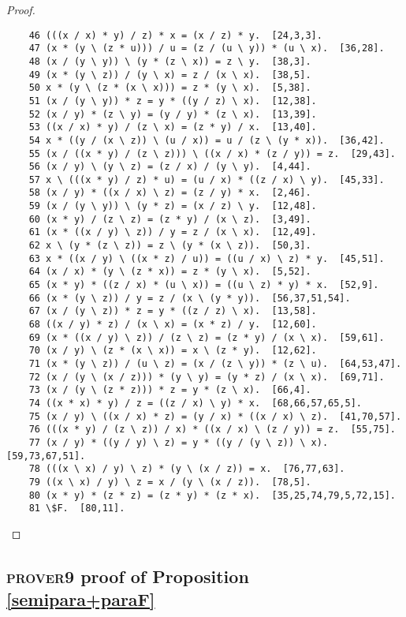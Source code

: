 \documentclass[12pt]{report}
\theoremstyle{definition}
\begin{document}
\begin{proof}
\begin{lstlisting}
    46 (((x / x) * y) / z) * x = (x / z) * y.  [24,3,3].
    47 (x * (y \ (z * u))) / u = (z / (u \ y)) * (u \ x).  [36,28].
    48 (x / (y \ y)) \ (y * (z \ x)) = z \ y.  [38,3].
    49 (x * (y \ z)) / (y \ x) = z / (x \ x).  [38,5].
    50 x * (y \ (z * (x \ x))) = z * (y \ x).  [5,38].
    51 (x / (y \ y)) * z = y * ((y / z) \ x).  [12,38].
    52 (x / y) * (z \ y) = (y / y) * (z \ x).  [13,39].
    53 ((x / x) * y) / (z \ x) = (z * y) / x.  [13,40].
    54 x * ((y / (x \ z)) \ (u / x)) = u / (z \ (y * x)).  [36,42].
    55 (x / ((x * y) / (z \ z))) \ ((x / x) * (z / y)) = z.  [29,43].
    56 (x / y) \ (y \ z) = (z / x) / (y \ y).  [4,44].
    57 x \ (((x * y) / z) * u) = (u / x) * ((z / x) \ y).  [45,33].
    58 (x / y) * ((x / x) \ z) = (z / y) * x.  [2,46].
    59 (x / (y \ y)) \ (y * z) = (x / z) \ y.  [12,48].
    60 (x * y) / (z \ z) = (z * y) / (x \ z).  [3,49].
    61 (x * ((x / y) \ z)) / y = z / (x \ x).  [12,49].
    62 x \ (y * (z \ z)) = z \ (y * (x \ z)).  [50,3].
    63 x * ((x / y) \ ((x * z) / u)) = ((u / x) \ z) * y.  [45,51].
    64 (x / x) * (y \ (z * x)) = z * (y \ x).  [5,52].
    65 (x * y) * ((z / x) * (u \ x)) = ((u \ z) * y) * x.  [52,9].
    66 (x * (y \ z)) / y = z / (x \ (y * y)).  [56,37,51,54].
    67 (x / (y \ z)) * z = y * ((z / z) \ x).  [13,58].
    68 ((x / y) * z) / (x \ x) = (x * z) / y.  [12,60].
    69 (x * ((x / y) \ z)) / (z \ z) = (z * y) / (x \ x).  [59,61].
    70 (x / y) \ (z * (x \ x)) = x \ (z * y).  [12,62].
    71 (x * (y \ z)) / (u \ z) = (x / (z \ y)) * (z \ u).  [64,53,47].
    72 (x / (y \ (x / z))) * (y \ y) = (y * z) / (x \ x).  [69,71].
    73 (x / (y \ (z * z))) * z = y * (z \ x).  [66,4].
    74 ((x * x) * y) / z = ((z / x) \ y) * x.  [68,66,57,65,5].
    75 (x / y) \ ((x / x) * z) = (y / x) * ((x / x) \ z).  [41,70,57].
    76 (((x * y) / (z \ z)) / x) * ((x / x) \ (z / y)) = z.  [55,75].
    77 (x / y) * ((y / y) \ z) = y * ((y / (y \ z)) \ x).  [59,73,67,51].
    78 (((x \ x) / y) \ z) * (y \ (x / z)) = x.  [76,77,63].
    79 ((x \ x) / y) \ z = x / (y \ (x / z)).  [78,5].
    80 (x * y) * (z * z) = (z * y) * (z * x).  [35,25,74,79,5,72,15].
    81 \$F.  [80,11].
  \end{lstlisting}
\end{proof}

\subsection{\textsc{prover9} proof of Proposition \ref{semipara+paraF}}
\end{document}
